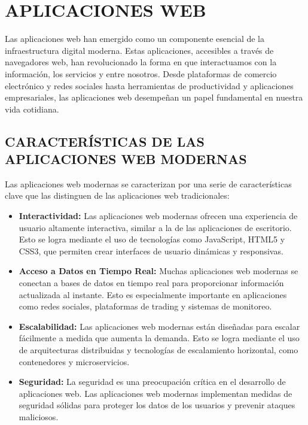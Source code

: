 \section{APLICACIONES WEB}

Las aplicaciones web han emergido como un componente esencial de la infraestructura digital moderna. Estas aplicaciones, accesibles a través de navegadores web, han revolucionado la forma en que interactuamos con la información, los servicios y entre nosotros. Desde plataformas de comercio electrónico y redes sociales hasta herramientas de productividad y aplicaciones empresariales, las aplicaciones web desempeñan un papel fundamental en nuestra vida cotidiana. \citep{flanagan2011javascript}

\subsection{CARACTERÍSTICAS DE LAS APLICACIONES WEB MODERNAS}

Las aplicaciones web modernas se caracterizan por una serie de características clave que las distinguen de las aplicaciones web tradicionales:

\begin{itemize}
    \item \textbf{Interactividad:} Las aplicaciones web modernas ofrecen una experiencia de usuario altamente interactiva, similar a la de las aplicaciones de escritorio. Esto se logra mediante el uso de tecnologías como JavaScript, HTML5 y CSS3, que permiten crear interfaces de usuario dinámicas y responsivas.
    \item \textbf{Acceso a Datos en Tiempo Real:} Muchas aplicaciones web modernas se conectan a bases de datos en tiempo real para proporcionar información actualizada al instante. Esto es especialmente importante en aplicaciones como redes sociales, plataformas de trading y sistemas de monitoreo.
    \item \textbf{Escalabilidad:} Las aplicaciones web modernas están diseñadas para escalar fácilmente a medida que aumenta la demanda. Esto se logra mediante el uso de arquitecturas distribuidas y tecnologías de escalamiento horizontal, como contenedores y microservicios.
    \item \textbf{Seguridad:} La seguridad es una preocupación crítica en el desarrollo de aplicaciones web. Las aplicaciones web modernas implementan medidas de seguridad sólidas para proteger los datos de los usuarios y prevenir ataques maliciosos.
\end{itemize}


